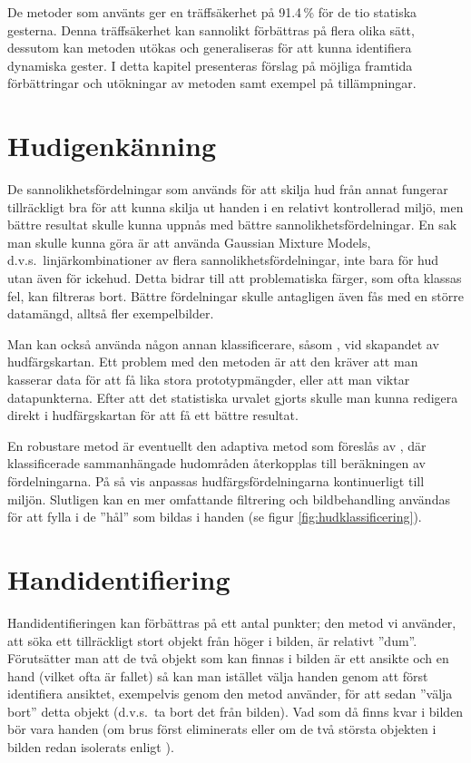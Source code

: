\documentclass[../rapport_MVEX01-11-05]{subfiles}
\begin{document}
De metoder som använts ger en träffsäkerhet på 91.4\,\% för de tio statiska
gesterna. Denna träffsäkerhet kan sannolikt förbättras på flera
olika sätt, dessutom
kan metoden utökas och generaliseras för att kunna identifiera
dynamiska gester. I detta kapitel presenteras förslag på möjliga framtida
förbättringar och utökningar av metoden samt exempel på tillämpningar.

\section{Hudigenkänning}
De sannolikhetsfördelningar som används för att skilja hud från annat
fungerar tillräckligt bra för att kunna skilja ut handen i en
relativt kontrollerad miljö, men bättre resultat skulle kunna uppnås
med bättre sannolikhetsfördelningar. En sak man skulle kunna göra
är att använda Gaussian Mixture Models, d.v.s.~linjärkombinationer av flera
sannolikhetsfördelningar, inte bara för hud utan även för ickehud.
Detta bidrar till att problematiska färger, som ofta klassas fel,
kan filtreras bort.
Bättre fördelningar skulle
antagligen även fås med en större datamängd, alltså fler
exempelbilder.

Man kan också använda någon annan klassificerare, såsom \knn,
vid skapandet av hudfärgskartan. Ett problem med den metoden är att den
kräver att man kasserar data för att få lika stora prototypmängder,
eller att man viktar datapunkterna.
Efter att det statistiska urvalet gjorts skulle man kunna redigera direkt i
hudfärgskartan för att få ett bättre resultat.

En robustare metod är eventuellt den adaptiva metod som föreslås av
, där klassificerade sammanhängade
hudområden återkopplas till beräkningen av fördelningarna.
På så vis anpassas hudfärgsfördelningarna kontinuerligt till miljön.
Slutligen kan en mer omfattande filtrering och bildbehandling användas
för att fylla i de ''hål'' som bildas i handen (se figur
\vref{fig:hudklassificering}).

\section{Handidentifiering}
Handidentifieringen kan förbättras på ett antal punkter;
den metod vi använder, att söka ett tillräckligt stort objekt från höger i
bilden, är relativt ''dum''. Förutsätter man att de två objekt som kan finnas
i bilden är ett ansikte och en hand (vilket ofta är fallet) så kan man
istället välja handen genom att först identifiera ansiktet, exempelvis genom
den metod  använder, för att sedan ''välja bort'' detta
objekt (d.v.s.~ta bort det från bilden). Vad som då finns kvar i bilden bör vara
handen (om brus först eliminerats eller om de två största
objekten i bilden redan isolerats enligt ).
\end{document}

